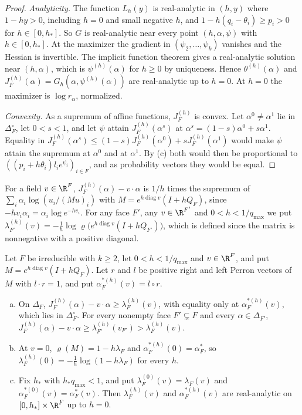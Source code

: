 \begin{proof}
\emph{Analyticity.} The function $L_h(y)$ is real-analytic in $(h,y)$ where
$1-hy>0$, including $h=0$ and small negative $h$, and $1-h(q_i-\theta_i)\ge p_i>0$
for $h\in[0,h_*]$. So $G$ is real-analytic near every point $(h,\alpha,\psi)$ with
$h\in[0,h_*]$. At the maximizer the gradient in $(\psi_2,\dots,\psi_k)$ vanishes
and the Hessian is invertible. The implicit function theorem gives a real-analytic
solution near $(h,\alpha)$, which is $\psi^{(h)}(\alpha)$ for $h\ge0$ by
uniqueness. Hence $\theta^{(h)}(\alpha)$ and
$J^{(h)}_F(\alpha)=G_h(\alpha,\psi^{(h)}(\alpha))$ are real-analytic up to
$h=0$. At $h=0$ the maximizer is $\log r_\alpha$, normalized.

\emph{Convexity.} As a supremum of affine functions, $J^{(h)}_F$ is convex. Let
$\alpha^0\ne\alpha^1$ lie in $\Delta_F^\circ$, let $0<s<1$, and let $\psi$ attain
$J^{(h)}_F(\alpha^s)$ at $\alpha^s=(1-s)\alpha^0+s\alpha^1$. Equality in
$J^{(h)}_F(\alpha^s)\le(1-s)J^{(h)}_F(\alpha^0)+sJ^{(h)}_F(\alpha^1)$ would make
$\psi$ attain the supremum at $\alpha^0$ and at $\alpha^1$. By (c) both would then
be proportional to $((p_i+h\theta_i)l_ie^{\psi_i})_{i\in F}$, and as probability
vectors they would be equal.
\end{proof}

For a field $v\in\R^F$, $J^{(h)}_F(\alpha)-v\cdot\alpha$ is $1/h$ times the
supremum of $\sum_i\alpha_i\log(u_i/(Mu)_i)$ with
$M=e^{h\operatorname{diag}v}(I+hQ_F)$, since $-hv_i\alpha_i=\alpha_i\log e^{-hv_i}$.
For any face $F'$, any $v\in\R^{F'}$ and $0<h<1/q_{\max}$ we put
$\lambda^{(h)}_{F'}(v)=-\frac1h\log\varrho\bigl(e^{h\operatorname{diag}v}(I+hQ_{F'})\bigr)$,
which is defined since the matrix is nonnegative with a positive diagonal.

\begin{proposition}\label{prop:discrete-variational}
Let $F$ be irreducible with $k\ge2$, let $0<h<1/q_{\max}$ and $v\in\R^F$, and
put $M=e^{h\operatorname{diag}v}(I+hQ_F)$. Let $r$ and $l$ be positive right and
left Perron vectors of $M$ with $l\cdot r=1$, and put
$\alpha^{*(h)}_F(v)=l\circ r$.
\begin{enumerate}[(a)]
\item On $\Delta_F$, $J^{(h)}_F(\alpha)-v\cdot\alpha\ge\lambda^{(h)}_F(v)$, with
equality only at $\alpha^{*(h)}_F(v)$, which lies in $\Delta_F^\circ$. For every
nonempty face $F'\subsetneq F$ and every $\alpha\in\Delta_{F'}$,
$J^{(h)}_F(\alpha)-v\cdot\alpha\ge\lambda^{(h)}_{F'}(v_{F'})>\lambda^{(h)}_F(v)$.
\item At $v=0$, $\varrho(M)=1-h\lambda_F$ and $\alpha^{*(h)}_F(0)=\alpha^*_F$, so
$\lambda^{(h)}_F(0)=-\frac1h\log(1-h\lambda_F)$ for every $h$.
\item Fix $h_*$ with $h_*q_{\max}<1$, and put $\lambda^{(0)}_F(v)=\lambda_F(v)$ and
$\alpha^{*(0)}_F(v)=\alpha^*_F(v)$. Then $\lambda^{(h)}_F(v)$ and
$\alpha^{*(h)}_F(v)$ are real-analytic on $[0,h_*]\times\R^F$ up to $h=0$.
\end{enumerate}
\end{proposition}

